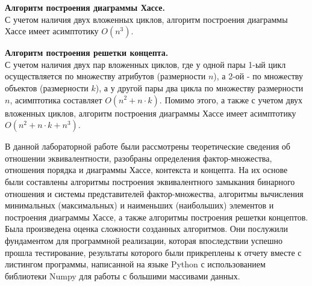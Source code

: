 \documentclass[bachelor, och, labwork]{shiza}
\begin{document}
        \textbf{Алгоритм построения диаграммы Хассе.}\\
            С учетом наличия двух вложенных циклов, алгоритм построения диаграммы Хассе имеет асимптотику $O(n^3)$.
        
        \textbf{Алгоритм построения решетки концепта.}\\
            С учетом наличия двух пар вложенных циклов, где у одной пары 1-ый цикл осуществляется по множеству атрибутов
            (размерности $n$), а 2-ой - по множеству объектов (размерности $k$), а у другой пары два цикла по множеству
            размерности $n$, асимптотика составляет $O(n^2 + n \cdot k)$. Помимо этого, а также с учетом двух вложенных
            циклов, алгоритм построения диаграммы Хассе имеет асимптотику $O(n^2 + n \cdot k + n^3)$.

\conclusion

    В данной лабораторной работе были рассмотрены теоретические сведения об отношении эквивалентности, разобраны
    определения фактор-множества, отношения порядка и диаграммы Хассе, контекста и концепта. На их основе были
    составлены алгоритмы построения эквивалентного замыкания бинарного отношения и системы представителей
    фактор-множества, алгоритмы вычисления минимальных (максимальных) и наименьших (наибольших) элементов и построения
    диаграммы Хассе, а также алгоритмы построения решетки концептов. Была произведена оценка сложности созданных
    алгоритмов. Они послужили фундаментом для программной реализации, которая впоследствии успешно прошла тестирование,
    результаты которого были прикреплены к отчету вместе с листингом программы, написанной на языке Python с
    использованием библиотеки Numpy для работы с большими массивами данных.
\end{document}
